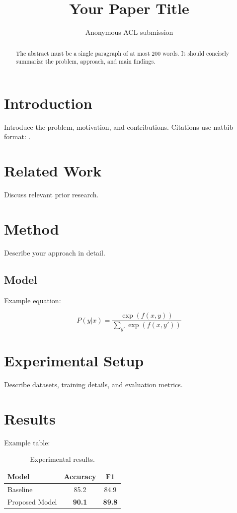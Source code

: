 \documentclass[11pt]{article}
\title{Your Paper Title}
\author{
Anonymous ACL submission
}
\date{}
\begin{document}
\maketitle

\begin{abstract}
The abstract must be a single paragraph of at most 200 words.
It should concisely summarize the problem, approach, and main findings.
\end{abstract}

\section{Introduction}

Introduce the problem, motivation, and contributions.
Citations use natbib format: \citep{manning1999foundations}.

\section{Related Work}

Discuss relevant prior research.

\section{Method}

Describe your approach in detail.

\subsection{Model}

Example equation:

\begin{equation}
P(y|x) = \frac{\exp(f(x,y))}{\sum_{y'} \exp(f(x,y'))}
\end{equation}

\section{Experimental Setup}

Describe datasets, training details, and evaluation metrics.

\section{Results}

Example table:

\begin{table}[t]
\centering
\begin{tabular}{lcc}
\toprule
Model & Accuracy & F1 \\
\midrule
Baseline & 85.2 & 84.9 \\
Proposed Model & \textbf{90.1} & \textbf{89.8} \\
\bottomrule
\end{tabular}
\caption{Experimental results.}
\end{table}
\end{document}
